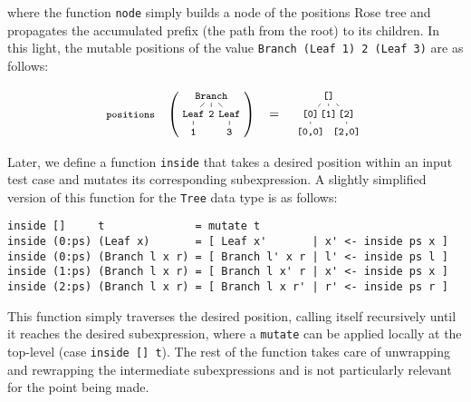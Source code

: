 \documentclass[sigconf, anonymous, review]{acmart}
\begin{document}
\noindent where the function \texttt{node} simply builds a node of the positions
Rose tree and propagates the accumulated prefix (the path from the root) to its
children.
%
In this light, the mutable positions of the value \texttt{Branch (Leaf 1) 2
  (Leaf 3)} are as follows:

\vspace{-5pt}
\begin{equation}
  \nonumber
  \footnotesize
  \texttt{positions}\quad
  \left(
  \tikz[
    baseline=-6mm,
    level distance=0.5cm,
    level 1/.style={sibling distance=0.5cm},
    level 2/.style={sibling distance=0.5cm}
  ]{
    \node {\texttt{Branch}}
      child {node {\texttt{Leaf}}
        child {node {\texttt{1}}}
      }
      child {node {\texttt{2}}}
      child {node {\texttt{Leaf}}
        child {node {\texttt{3}}}
      };
  }
  \right)
  \quad
  =
  \quad
  \tikz[
    baseline=-6mm,
    level distance=0.5cm,
    level 1/.style={sibling distance=0.5cm},
    level 2/.style={sibling distance=0.5cm}
  ]{
    \node {\texttt{[]}}
      child {node {\texttt{[0]}}
        child {node {\texttt{[0,0]}}}
      }
      child {node {\texttt{[1]}}}
      child {node {\texttt{[2]}}
        child {node {\texttt{[2,0]}}}
      };
  }
\end{equation}

Later, we define a function \texttt{inside} that takes a desired
position within an input test case and mutates its corresponding subexpression.
%
%
A slightly simplified version of this function for the \texttt{Tree} data type is
as follows:

\begin{verbatim}
inside []     t              = mutate t
inside (0:ps) (Leaf x)       = [ Leaf x'       | x' <- inside ps x ]
inside (0:ps) (Branch l x r) = [ Branch l' x r | l' <- inside ps l ]
inside (1:ps) (Branch l x r) = [ Branch l x' r | x' <- inside ps x ]
inside (2:ps) (Branch l x r) = [ Branch l x r' | r' <- inside ps r ]
\end{verbatim}

\noindent This function simply traverses the desired position, calling itself
recursively until it reaches the desired subexpression, where a \texttt{mutate}
can be applied locally at the top-level (case \texttt{inside [] t}).
%
The rest of the function takes care of unwrapping and rewrapping the
intermediate subexpressions and is not particularly relevant for the point being
made.
\end{document}
